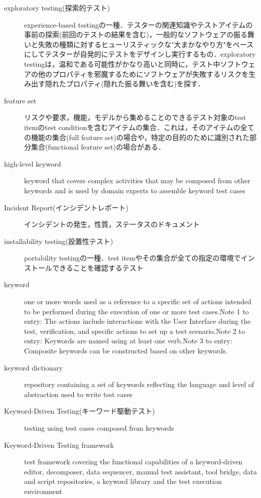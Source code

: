 \begin{description}
    \item[exploratory testing(探索的テスト)]experience-based testingの一種．テスターの関連知識やテストアイテムの事前の探索(前回のテストの結果を含む)，一般的なソフトウェアの振る舞いと失敗の種類に対するヒューリスティックな"大まかなやり方"をベースにしてテスターが自発的にテストをデザインし実行するもの．exploratory testingは，温和である可能性がかなり高いと同時に，テスト中ソフトウェアの他のプロパティを邪魔するためにソフトウェアが失敗するリスクを生み出す隠れたプロパティ(隠れた振る舞いを含む)を探す．
    \item[feature set]リスクや要求，機能，モデルから集めることのできるテスト対象のtest itemのtest conditionを含むアイテムの集合．これは，そのアイテムの全ての機能の集合(full feature set)の場合や，特定の目的のために識別された部分集合(functional feature set)の場合がある．
    \item[high-level keyword]keyword that covers complex activities that may be composed from other keywords and is used by domain experts to assemble keyword test cases
    \item[Incident Report(インシデントレポート)]インシデントの発生，性質，ステータスのドキュメント
    \item[installability testing(設置性テスト)]portability testingの一種．test itemやその集合が全ての指定の環境でインストールできることを確認するテスト
    \item[keyword]one or more words used as a reference to a specific set of actions intended to be performed during the execution of one or more test cases.Note 1 to entry: The actions include interactions with the User Interface during the test, verification, and specific actions to set up a test scenario.Note 2 to entry: Keywords are named using at least one verb.Note 3 to entry: Composite keywords can be constructed based on other keywords.
    \item[keyword dictionary]repository containing a set of keywords reflecting the language and level of abstraction used to write test cases
    \item[Keyword-Driven Testing(キーワード駆動テスト)]testing using test cases composed from keywords
    \item[Keyword-Driven Testing framework]test framework covering the functional capabilities of a keyword-driven editor, decomposer, data sequencer, manual test assistant, tool bridge, data and script repositories, a keyword library and the test execution environment

\end{description}
